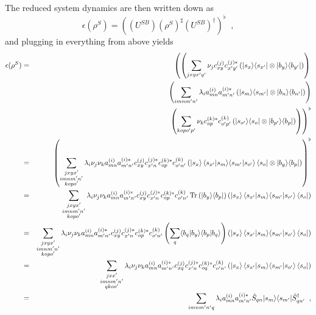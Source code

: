The reduced system dynamics are then written down as 
$$
\epsilon(\rho^S) = \left((U^{SB})\left(\rho^{S}\right)^\sharp(U^{SB})^\dagger\right)^\flat  \;\;,
$$
and plugging in everything from above yields
\begin{eqnarray*}
\epsilon(\rho^S) &=& \left(\left(\sum_{jxyx^\prime y^\prime} \nu_j c_{xy}^{(j)}c_{x^\prime y^\prime}^{(j)*}\left( |s_x\rangle\langle s_{x^\prime}| \otimes |b_y\rangle\langle b_{y^\prime}|\right)\right)\right.\\
& &\left(\sum_{imnm^\prime n^\prime} \lambda_i a_{mn}^{(i)}a_{m^\prime n^\prime}^{(i)*} \left(|s_m\rangle\langle s_{m^\prime}| \otimes |b_n\rangle\langle b_{n^\prime}|\right)\right)\\
& &\left.\left(\sum_{kopo^\prime p^\prime} \nu_k c_{op}^{(k)*}c_{o^\prime p^\prime}^{(k)} \left(|s_{o^\prime} \rangle\langle s_{o} | \otimes |b_{p^\prime} \rangle\langle b_{p} |\right)\right)\right)^\flat\\
&=& \left(\sum_{\substack{jxyx^\prime \\imnm^\prime n^\prime\\kopo^\prime }} \lambda_i \nu_j \nu_k a_{mn}^{(i)}a_{m^\prime n^\prime}^{(i)*} c_{xy}^{(j)}c_{x^\prime n}^{(j)*} c_{op}^{(k)*}c_{o^\prime n^\prime}^{(k)} \left( \left|s_x\right\rangle\langle s_{x^\prime}|s_m\rangle\langle s_{m^\prime}|s_{o^\prime}\rangle\left\langle s_{o}\right| \otimes |b_y\rangle\langle b_{p}|\right)\right)^\flat\\
&=& \sum_{\substack{jxyx^\prime \\imnm^\prime n^\prime\\kopo^\prime }} \lambda_i \nu_j \nu_k a_{mn}^{(i)}a_{m^\prime n^\prime}^{(i)*} c_{xy}^{(j)}c_{x^\prime n}^{(j)*} c_{op}^{(k)*}c_{o^\prime n^\prime}^{(k)} \operatorname{Tr}\left(|b_y\rangle\langle b_{p}|\right)\left( \left|s_x\right\rangle\langle s_{x^\prime}|s_m\rangle\langle s_{m^\prime}|s_{o^\prime}\rangle\left\langle s_{o}\right| \right)\\
&=& \sum_{\substack{jxyx^\prime \\imnm^\prime n^\prime\\kopo^\prime }} \lambda_i \nu_j \nu_k a_{mn}^{(i)}a_{m^\prime n^\prime}^{(i)*} c_{xy}^{(j)}c_{x^\prime n}^{(j)*} c_{op}^{(k)*}c_{o^\prime n^\prime}^{(k)} \left(\sum_q\langle b_q|b_y\rangle\langle b_{p}|b_q\rangle\right)\left( \left|s_x\right\rangle\langle s_{x^\prime}|s_m\rangle\langle s_{m^\prime}|s_{o^\prime}\rangle\left\langle s_{o}\right| \right)\\
&=& \sum_{\substack{jxx^\prime \\imnm^\prime n^\prime\\qkoo^\prime}} \lambda_i \nu_j \nu_k a_{mn}^{(i)}a_{m^\prime n^\prime}^{(i)*} c_{xq}^{(j)}c_{x^\prime n}^{(j)*} c_{oq}^{(k)*}c_{o^\prime n^\prime}^{(k)} \left( \left|s_x\right\rangle\langle s_{x^\prime}|s_m\rangle\langle s_{m^\prime}|s_{o^\prime}\rangle\left\langle s_{o}\right| \right)\\
&=& \sum_{imnm^\prime n^\prime q} \lambda_i a_{mn}^{(i)} a_{m^\prime n^\prime}^{(i)*} \hat{S}_{qn} |s_m\rangle\langle s_{m^\prime}| \hat{S}_{qn^\prime}^\dagger\;\;,
\end{eqnarray*}
